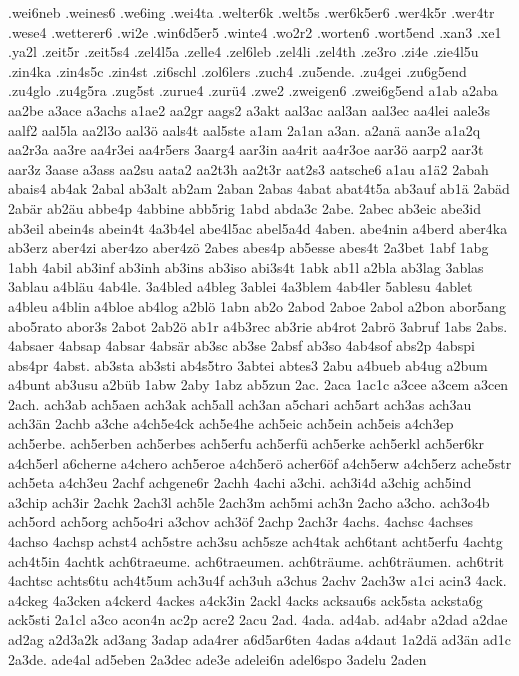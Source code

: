 {.wei6neb
.weines6
.we6ing
.wei4ta
.welter6k
.welt5s
.wer6k5er6
.wer4k5r
.wer4tr
.wese4
.wetterer6
.wi2e
.win6d5er5
.winte4
.wo2r2
.worten6
.wort5end
.xan3
.xe1
.ya2l
.zeit5r
.zeit5s4
.zel4l5a
.zelle4
.zel6leb
.zel4li
.zel4th
.ze3ro
.zi4e
.zie4l5u
.zin4ka
.zin4s5c
.zin4st
.zi6schl
.zol6lers
.zuch4
.zu5ende.
.zu4gei
.zu6g5end
.zu4glo
.zu4g5ra
.zug5st
.zurue4
.zurü4
.zwe2
.zweigen6
.zwei6g5end
a1ab
a2aba
aa2be
a3ace
a3achs
a1ae2
aa2gr
aags2
a3akt
aal3ac
aal3an
aal3ec
aa4lei
aale3s
aalf2
aal5la
aa2l3o
aal3ö
aals4t
aal5ste
a1am
2a1an
a3an.
a2anä
aan3e
a1a2q
aa2r3a
aa3re
aa4r3ei
aa4r5ers
3aarg4
aar3in
aa4rit
aa4r3oe
aar3ö
aarp2
aar3t
aar3z
3aase
a3ass
aa2su
aata2
aa2t3h
aa2t3r
aat2s3
aatsche6
a1au
a1ä2
2abah
abais4
ab4ak
2abal
ab3alt
ab2am
2aban
2abas
4abat
abat4t5a
ab3auf
ab1ä
2abäd
2abär
ab2äu
abbe4p
4abbine
abb5rig
1abd
abda3c
2abe.
2abec
ab3eic
abe3id
ab3eil
abein4s
abein4t
4a3b4el
abe4l5ac
abel5a4d
4aben.
abe4nin
a4berd
aber4ka
ab3erz
aber4zi
aber4zo
aber4zö
2abes
abes4p
ab5esse
abes4t
2a3bet
1abf
1abg
1abh
4abil
ab3inf
ab3inh
ab3ins
ab3iso
abi3s4t
1abk
ab1l
a2bla
ab3lag
3ablas
3ablau
a4bläu
4ab4le.
3a4bled
a4bleg
3ablei
4a3blem
4ab4ler
5ablesu
4ablet
a4bleu
a4blin
a4bloe
ab4log
a2blö
1abn
ab2o
2abod
2aboe
2abol
a2bon
abor5ang
abo5rato
abor3s
2abot
2ab2ö
ab1r
a4b3rec
ab3rie
ab4rot
2abrö
3abruf
1abs
2abs.
4absaer
4absap
4absar
4absär
ab3sc
ab3se
2absf
ab3so
4ab4sof
abs2p
4abspi
abs4pr
4abst.
ab3sta
ab3sti
ab4s5tro
3abtei
abtes3
2abu
a4bueb
ab4ug
a2bum
a4bunt
ab3usu
a2büb
1abw
2aby
1abz
ab5zun
2ac.
2aca
1ac1c
a3cee
a3cem
a3cen
2ach.
ach3ab
ach5aen
ach3ak
ach5all
ach3an
a5chari
ach5art
ach3as
ach3au
ach3än
2achb
a3che
a4ch5e4ck
ach5e4he
ach5eic
ach5ein
ach5eis
a4ch3ep
ach5erbe.
ach5erben
ach5erbes
ach5erfu
ach5erfü
ach5erke
ach5erkl
ach5er6kr
a4ch5erl
a6cherne
a4chero
ach5eroe
a4ch5erö
acher6öf
a4ch5erw
a4ch5erz
ache5str
ach5eta
a4ch3eu
2achf
achgene6r
2achh
4achi
a3chi.
ach3i4d
a3chig
ach5ind
a3chip
ach3ir
2achk
2ach3l
ach5le
2ach3m
ach5mi
ach3n
2acho
a3cho.
ach3o4b
ach5ord
ach5org
ach5o4ri
a3chov
ach3öf
2achp
2ach3r
4achs.
4achsc
4achses
4achso
4achsp
achst4
ach5stre
ach3su
ach5sze
ach4tak
ach6tant
acht5erfu
4achtg
ach4t5in
4achtk
ach6traeume.
ach6traeumen.
ach6träume.
ach6träumen.
ach6trit
4achtsc
achts6tu
ach4t5um
ach3u4f
ach3uh
a3chus
2achv
2ach3w
a1ci
acin3
4ack.
a4ckeg
4a3cken
a4ckerd
4ackes
a4ck3in
2ackl
4acks
acksau6s
ack5sta
acksta6g
ack5sti
2a1cl
a3co
acon4n
ac2p
acre2
2acu
2ad.
4ada.
ad4ab.
ad4abr
a2dad
a2dae
ad2ag
a2d3a2k
ad3ang
3adap
ada4rer
a6d5ar6ten
4adas
a4daut
1a2dä
ad3än
ad1c
2a3de.
ade4al
ad5eben
2a3dec
ade3e
adelei6n
adel6spo
3adelu
2aden
}
